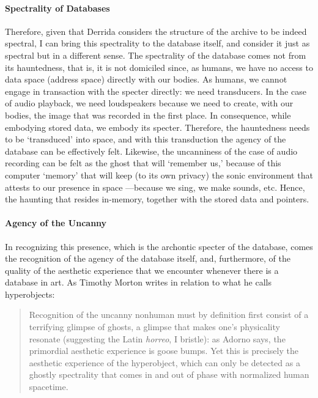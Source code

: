 \paragraph{Spectrality of Databases}
Therefore, given that Derrida considers the structure of the archive to be indeed spectral, I can bring this spectrality to the database itself, and consider it just as spectral but in a different sense. The spectrality of the database comes not from its hauntedness, that is, it is not domiciled since, as humans, we have no access to data space (address space) directly with our bodies. As humans, we cannot engage in transaction with the specter directly: we need transducers. In the case of audio playback, we need loudspeakers because we need to create, with our bodies, the image that was recorded in the first place. In consequence, while embodying stored data, we embody its specter. Therefore, the hauntedness needs to be `transduced' into space, and with this transduction the agency of the database can be effectively felt. Likewise, the uncanniness of the case of audio recording can be felt as the ghost that will `remember us,' because of this computer `memory' that will keep (to its own privacy) the sonic environment that attests to our presence in space ---because we sing, we make sounds, etc. Hence, the haunting that resides in-memory, together with the stored data and pointers.

\paragraph{Agency of the Uncanny}
In recognizing this presence, which is the archontic specter of the database, comes the recognition of the agency of the database itself, and, furthermore, of the quality of the aesthetic experience that we encounter whenever there is a database in art. As Timothy Morton \parencite{Mor13:Hyp} writes in relation to what he calls hyperobjects:

\begin{quote}
	Recognition of the uncanny nonhuman must by definition first consist of a terrifying glimpse of ghosts, a glimpse that makes one's physicality resonate (suggesting the Latin \textit{horreo}, I bristle): as Adorno says, the primordial aesthetic experience is goose bumps. Yet this is precisely the aesthetic experience of the hyperobject, which can only be detected as a ghostly spectrality that comes in and out of phase with normalized human spacetime. \parencite[169]{Mor13:Hyp}
\end{quote}

